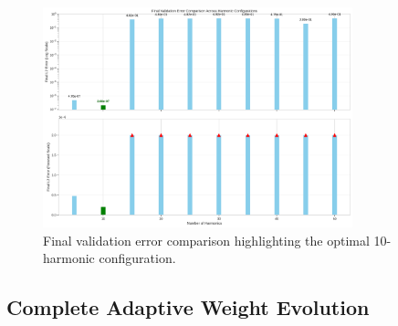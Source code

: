 \begin{figure}[H]
    \centering
    \includegraphics[width=0.8\textwidth]{figures/validation_error_final.png}
    \caption{Final validation error comparison highlighting the optimal 10-harmonic configuration.}
    \label{fig:validation_final}
\end{figure}

\subsection{Complete Adaptive Weight Evolution}

